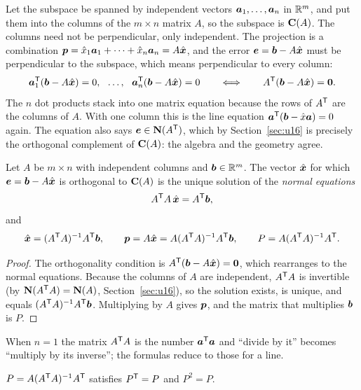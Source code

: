 Let the subspace be spanned by independent vectors $\boldsymbol{a}_1,\dots,\boldsymbol{a}_n$ in $\mathbb{R}^m$, and
put them into the columns of the $m\times n$ matrix $A$, so the subspace is $\mathbf{C}(A)$. The
columns need not be perpendicular, only independent. The projection is a combination
$\boldsymbol{p}=\hat{x}_1\boldsymbol{a}_1+\cdots+\hat{x}_n\boldsymbol{a}_n=A\hat{\boldsymbol{x}}$, and the error
$\boldsymbol{e}=\boldsymbol{b}-A\hat{\boldsymbol{x}}$ must be perpendicular to the subspace, which means
perpendicular to every column:
\[
  \vb{a}_1\T(\vb{b}-A\hat{\vb{x}})=0,\ \ \dots,\ \ \vb{a}_n\T(\vb{b}-A\hat{\vb{x}})=0
  \qquad\Longleftrightarrow\qquad
  A\T(\vb{b}-A\hat{\vb{x}})=\vb{0}.
\]
The $n$ dot products stack into one matrix equation because the rows of $A^{\mathsf{T}}$ are the
columns of $A$. With one column this is the line equation $\boldsymbol{a}^{\mathsf{T}}(\boldsymbol{b}-\hat{x}\boldsymbol{a})=0$
again. The equation also says $\boldsymbol{e}\in\mathbf{N}(A^{\mathsf{T}})$, which by Section~\ref{sec:u16} is
precisely the orthogonal complement of $\mathbf{C}(A)$: the algebra and the geometry agree.

\begin{theorem}\label{thm:u17-projection}
Let $A$ be $m\times n$ with independent columns and $\boldsymbol{b}\in\mathbb{R}^m$. The vector
$\hat{\boldsymbol{x}}$ for which $\boldsymbol{e}=\boldsymbol{b}-A\hat{\boldsymbol{x}}$ is orthogonal to $\mathbf{C}(A)$ is the unique
solution of the \emph{normal equations}
\[
  A^{\mathsf{T}} A\,\hat{\boldsymbol{x}}=A^{\mathsf{T}}\boldsymbol{b},
\]
and
\[
  \hat{\boldsymbol{x}}=(A^{\mathsf{T}} A)^{-1}A^{\mathsf{T}}\boldsymbol{b},\qquad
  \boldsymbol{p}=A\hat{\boldsymbol{x}}=A(A^{\mathsf{T}} A)^{-1}A^{\mathsf{T}}\boldsymbol{b},\qquad
  P=A(A^{\mathsf{T}} A)^{-1}A^{\mathsf{T}} .
\]
\end{theorem}

\begin{proof}
The orthogonality condition is $A^{\mathsf{T}}(\boldsymbol{b}-A\hat{\boldsymbol{x}})=\boldsymbol{0}$, which rearranges to the
normal equations. Because the columns of $A$ are independent, $A^{\mathsf{T}} A$ is invertible
(by $\mathbf{N}(A^{\mathsf{T}} A)=\mathbf{N}(A)$, Section~\ref{sec:u16}), so the solution exists, is unique, and
equals $(A^{\mathsf{T}} A)^{-1}A^{\mathsf{T}}\boldsymbol{b}$. Multiplying by $A$ gives $\boldsymbol{p}$, and the matrix that
multiplies $\boldsymbol{b}$ is $P$.
\end{proof}

When $n=1$ the matrix $A^{\mathsf{T}} A$ is the number $\boldsymbol{a}^{\mathsf{T}}\boldsymbol{a}$ and ``divide by it'' becomes
``multiply by its inverse''; the formulas reduce to those for a line.

\begin{proposition}\label{prop:u17-pprops}
$P=A(A^{\mathsf{T}} A)^{-1}A^{\mathsf{T}}$ satisfies $P^{\mathsf{T}}=P$ and $P^2=P$.
\end{proposition}

